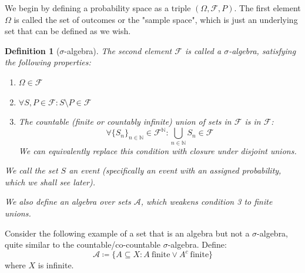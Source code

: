 \documentclass[10pt,letterpaper]{article} %
\newtheorem{defn}{Definition}[section]
\begin{document}
We begin by defining a probability space as a triple $(\Omega, \mathcal{F}, P)$. The first element $\Omega$ is called the set of outcomes or the "sample space", which is just an underlying set that can be defined as we wish. 
\begin{defn}[$\sigma$-algebra]
The second element $\mathcal{F}$ is called a $\sigma$-algebra, satisfying the following properties:
\begin{enumerate}
\item $\Omega \in \mathcal{F}$
\item $\forall S, P \in \mathcal{F}: S \setminus P \in \mathcal{F}$
\item The countable (finite or countably infinite) union of sets in $\mathcal{F}$ is in $\mathcal{F}$:
\begin{equation*}
\forall \{S_n\}_{n \in \mathbb{N}} \in \mathcal{F}^\mathbb{N}: \bigcup_{n \in \mathbb{N}}S_n \in \mathcal{F}
\end{equation*}
We can equivalently replace this condition with closure under disjoint unions.
\end{enumerate}
We call the set $S$ an event (specifically an event with an assigned probability, which we shall see later).

We also define an algebra over sets $\mathcal{A}$, which weakens condition 3 to finite unions.
\end{defn}

Consider the following example of a set that is an algebra but not a $\sigma$-algebra, quite similar to the countable/co-countable $\sigma$-algebra. Define:
\begin{equation*}
\mathcal{A} \coloneq \{A \subseteq X : A \ \text{finite} \lor A^c \ \text{finite}\}   
\end{equation*}
where $X$ is infinite.
\end{document}
